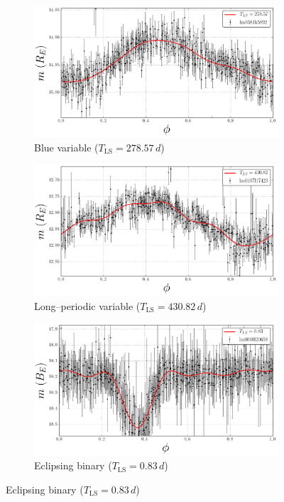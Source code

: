 \begin{figure}[h]
\ContinuedFloat
	\begin{subfigure}[t]{0.49\textwidth}
		\centering
		\caption{Blue variable ($T_{\text{LS}} = 278.57 \, \unit{d}$)}
		\label{fig:lightcurve-bv}
		\includegraphics[width=\textwidth]{figures/lightcurves/bv.png}
	\end{subfigure}
	\begin{subfigure}[t]{0.49\textwidth}
		\centering
		\caption{Long--periodic variable ($T_{\text{LS}} = 430.82 \, \unit{d}$)}
		\label{fig:lightcurve-lpv}
		\includegraphics[width=\textwidth]{figures/lightcurves/lpv.png}
	\end{subfigure}
	\begin{subfigure}[t]{0.49\textwidth}
		\centering
		\caption{Eclipsing binary ($T_{\text{LS}} = 0.83 \, \unit{d}$)}
		\label{fig:lightcurve-eb}
		\includegraphics[width=\textwidth]{figures/lightcurves/eb.png}

\end{subfigure}
\end{figure}
